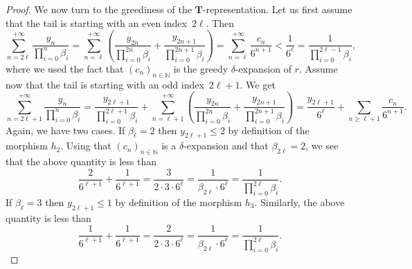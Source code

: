 \documentclass[10pt,a4paper]{amsart}
\begin{document}
\begin{proof}
We now turn to the greediness of the $\mathbf{T}$-representation. Let us first assume that the tail is starting with an even index~$2\ell$. Then
\[
    \sum_{n= 2\ell}^{+\infty} \frac{y_n}{\prod_{i=0}^n\beta_i}
    =\sum_{n= \ell}^{+\infty} \left( \frac{y_{2n}}{\prod_{i=0}^{2n}\beta_i}
    +\frac{y_{2n+1}}{\prod_{i=0}^{2n+1}\beta_i}\right)
    =\sum_{n= \ell}^{+\infty} \frac{c_n}{6^{n+1}}
    <\frac{1}{6^{\ell}}
    =\frac{1}{\prod_{i=0}^{2\ell-1} \beta_i},
\]
where we used the fact that $(c_n)_{n\in\mathbb{N}}$ is the greedy $\delta$-expansion of $r$. Assume now that the tail is starting with an odd index~$2\ell+1$. We get
\[
    \sum_{n=2\ell+1}^{+\infty} \frac{y_n}{\prod_{i=0}^n\beta_i}
    =\frac{y_{2\ell+1}}{\prod_{i=0}^{2\ell+1}\beta_i} 
    + \sum_{n=\ell+1}^{+\infty} \left( \frac{y_{2n}}{\prod_{i=0}^{2n}\beta_i}
    +\frac{y_{2n+1}}{\prod_{i=0}^{2n+1}\beta_i}\right)
    =\frac{y_{2\ell+1}}{6^\ell} +\sum_{n\ge \ell+1} \frac{c_n}{6^{n+1}}.
\]
Again, we have two cases. If $\beta_\ell=2$ then 
$y_{2\ell+1}\le 2$ by definition of the morphism $h_2$. Using that $(c_n)_{n\in\mathbb{N}}$ is a $\delta$-expansion and that $\beta_{2\ell}=2$, we see that the above quantity is less than
\[
    \frac{2}{6^{\ell+1}}+\frac{1}{6^{\ell+1}}
    =\frac{3}{2\cdot 3\cdot 6^\ell}=\frac{1}{\beta_{2\ell}\cdot 6^\ell}
    =\frac{1}{\prod_{i=0}^{2\ell}\beta_i}.
\]
If $\beta_\ell=3$ then $y_{2\ell+1}\le 1$ by definition of the morphism $h_3$. Similarly, the above quantity is less than
\[
    \frac{1}{6^{\ell+1}}+\frac{1}{6^{\ell+1}}
    =\frac{2}{2\cdot 3 \cdot 6^\ell}
    =\frac{1}{\beta_{2\ell}\cdot 6^\ell}
    =\frac{1}{\prod_{i=0}^{2\ell}\beta_i}.
\]
\end{proof}
\end{document}
